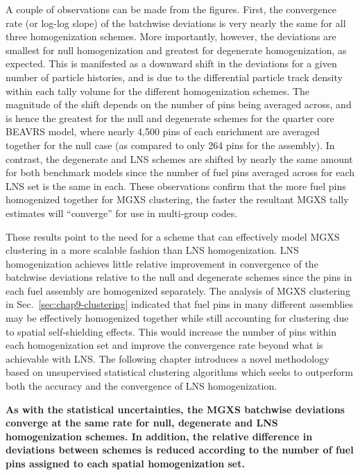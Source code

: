 A couple of observations can be made from the figures. First, the convergence rate (or log-log slope) of the batchwise deviations is very nearly the same for all three homogenization schemes. More importantly, however, the deviations are smallest for null homogenization and greatest for degenerate homogenization, as expected. This is manifested as a downward shift in the deviations for a given number of particle histories, and is due to the differential particle track density within each tally volume for the different homogenization schemes. The magnitude of the shift depends on the number of pins being averaged across, and is hence the greatest for the null and degenerate schemes for the quarter core \ac{BEAVRS} model, where nearly 4,500 pins of each enrichment are averaged together for the null case (as compared to only 264 pins for the assembly). In contrast, the degenerate and \ac{LNS} schemes are shifted by nearly the same amount for both benchmark models since the number of fuel pins averaged across for each \ac{LNS} set is the same in each. These observations confirm that the more fuel pins homogenized together for \ac{MGXS} clustering, the faster the resultant \ac{MGXS} tally estimates will ``converge'' for use in multi-group codes.

These results point to the need for a scheme that can effectively model \ac{MGXS} clustering in a more scalable fashion than \ac{LNS} homogenization. \ac{LNS} homogenization achieves little relative improvement in convergence of the batchwise deviations relative to the null and degenerate schemes since the pins in each fuel assembly are homogenized separately. The analysis of \ac{MGXS} clustering in Sec.~\ref{sec:chap9-clustering} indicated that fuel pins in many different assemblies may be effectively homogenized together while still accounting for clustering due to spatial self-shielding effects. This would increase the number of pins within each homogenization set and improve the convergence rate beyond what is achievable with \ac{LNS}. The following chapter introduces a novel methodology based on unsupervised statistical clustering algorithms which seeks to outperform both the accuracy and the convergence of \ac{LNS} homogenization.

\begin{emphbox}
\textbf{As with the statistical uncertainties, the \ac{MGXS} batchwise deviations converge at the same rate for null, degenerate and \ac{LNS} homogenization schemes. In addition, the relative difference in deviations between schemes is reduced according to the number of fuel pins assigned to each spatial homogenization set.}
\end{emphbox}

